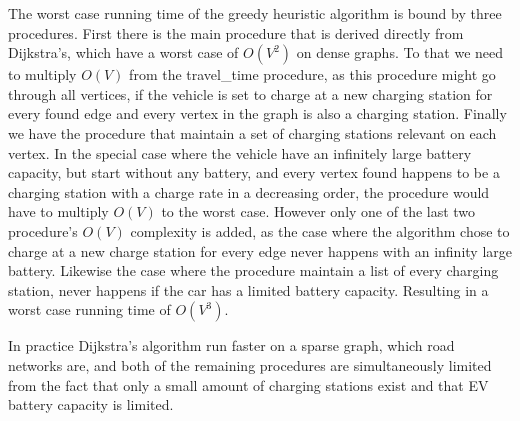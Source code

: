 The worst case running time of the greedy heuristic algorithm is bound by three procedures. First there is the main procedure that is derived directly from Dijkstra's, which have a worst case of $O(V^2)$ on dense graphs. To that we need to multiply $O(V)$ from the travel\_time procedure, as this procedure might go through all vertices, if the vehicle is set to charge at a new charging station for every found edge and every vertex in the graph is also a charging station. Finally we have the procedure that maintain a set of charging stations relevant on each vertex. In the special case where the vehicle have an infinitely large battery capacity, but start without any battery, and every vertex found happens to be a charging station with a charge rate in a decreasing order, the procedure would have to multiply $O(V)$ to the worst case.
However only one of the last two procedure's $O(V)$ complexity is added, as the case where the algorithm chose to charge at a new charge station for every edge never happens with an infinity large battery. Likewise the case where the procedure maintain a list of every charging station, never happens if the car has a limited battery capacity. Resulting in a worst case running time of $O(V^3)$.

In practice Dijkstra's algorithm run faster on a sparse graph, which road networks are, and both of the remaining procedures are simultaneously limited from the fact that only a small amount of charging stations exist and that EV battery capacity is limited.
